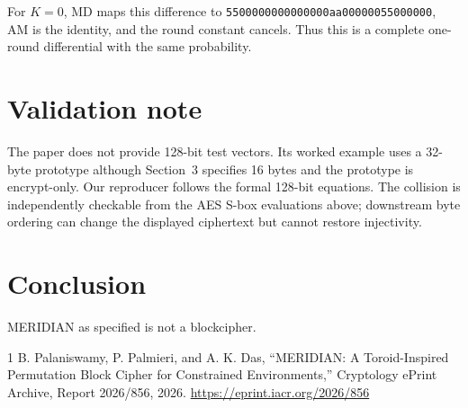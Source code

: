\documentclass[10pt,twocolumn]{article}
\begin{document}
For $K=0$, MD maps this difference to \texttt{5500000000000000aa00000055000000}, AM is the identity, and the round constant cancels. Thus this is a complete one-round differential with the same probability.


\section{Validation note}

The paper does not provide 128-bit test vectors. Its worked example uses a 32-byte prototype although Section~3 specifies 16 bytes and the prototype is encrypt-only. Our reproducer follows the formal 128-bit equations. The collision is independently checkable from the AES S-box evaluations above; downstream byte ordering can change the displayed ciphertext but cannot restore injectivity.

\section{Conclusion}

MERIDIAN as specified is not a blockcipher. 

\begin{thebibliography}{1}\small
\setlength{\itemsep}{0pt}
 B. Palaniswamy, P. Palmieri, and A. K. Das, ``MERIDIAN: A Toroid-Inspired Permutation Block Cipher for Constrained Environments,'' Cryptology ePrint Archive, Report 2026/856, 2026. \url{https://eprint.iacr.org/2026/856}
\end{thebibliography}
\end{document}
